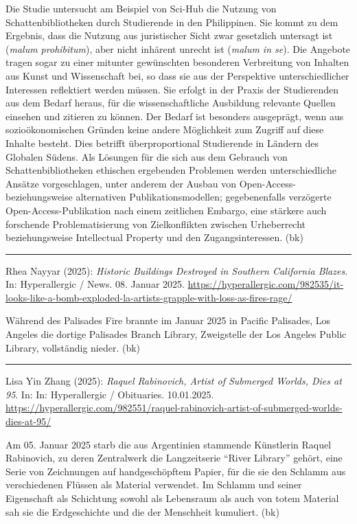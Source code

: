 \documentclass[a4paper,
fontsize=11pt,
oneside,
numbers=noperiodatend,
parskip=half-,
bibliography=totoc,
final
]{scrartcl}
\begin{document}
Die Studie untersucht am Beispiel von Sci-Hub die Nutzung von
Schattenbibliotheken durch Studierende in den Philippinen. Sie kommt zu
dem Ergebnis, dass die Nutzung aus juristischer Sicht zwar gesetzlich
untersagt ist (\emph{malum prohibitum}), aber nicht inhärent unrecht ist
(\emph{malum in se}). Die Angebote tragen sogar zu einer mitunter
gewünschten besonderen Verbreitung von Inhalten aus Kunst und
Wissenschaft bei, so dass sie aus der Perspektive unterschiedlicher
Interessen reflektiert werden müssen. Sie erfolgt in der Praxis der
Studierenden aus dem Bedarf heraus, für die wissenschaftliche Ausbildung
relevante Quellen einsehen und zitieren zu können. Der Bedarf ist
besonders ausgeprägt, wenn aus sozioökonomischen Gründen keine andere
Möglichkeit zum Zugriff auf diese Inhalte besteht. Dies betrifft
überproportional Studierende in Ländern des Globalen Südens. Als
Lösungen für die sich aus dem Gebrauch von Schattenbibliotheken
ethischen ergebenden Problemen werden unterschiedliche Ansätze
vorgeschlagen, unter anderem der Ausbau von Open-Access- beziehungsweise
alternativen Publikationsmodellen; gegebenenfalls verzögerte
Open-Access-Publikation nach einem zeitlichen Embargo, eine stärkere
auch forschende Problematisierung von Zielkonflikten zwischen
Urheberrecht beziehungsweise Intellectual Property und den
Zugangsinteressen. (bk)

\begin{center}\rule{0.5\linewidth}{0.5pt}\end{center}

Rhea Nayyar (2025): \emph{Historic Buildings Destroyed in Southern
California Blazes}. In: Hyperallergic / News. 08. Januar 2025.
\url{https://hyperallergic.com/982535/it-looks-like-a-bomb-exploded-la-artists-grapple-with-loss-as-fires-rage/}

Während des Palisades Fire brannte im Januar 2025 in Pacific Palisades,
Los Angeles die dortige Palisades Branch Library, Zweigstelle der Los
Angeles Public Library, vollständig nieder. (bk)

\begin{center}\rule{0.5\linewidth}{0.5pt}\end{center}

Lisa Yin Zhang (2025): \emph{Raquel Rabinovich, Artist of Submerged
Worlds, Dies at 95}. In: In: Hyperallergic / Obituaries. 10.01.2025.
\url{https://hyperallergic.com/982551/raquel-rabinovich-artist-of-submerged-worlds-dies-at-95/}

Am 05. Januar 2025 starb die aus Argentinien stammende Künstlerin Raquel
Rabinovich, zu deren Zentralwerk die Langzeitserie \enquote{River
Library} gehört, eine Serie von Zeichnungen auf handgeschöpftem Papier,
für die sie den Schlamm aus verschiedenen Flüssen als Material
verwendet. Im Schlamm und seiner Eigenschaft als Schichtung sowohl als
Lebensraum als auch von totem Material sah sie die Erdgeschichte und die
der Menschheit kumuliert. (bk)
\end{document}
